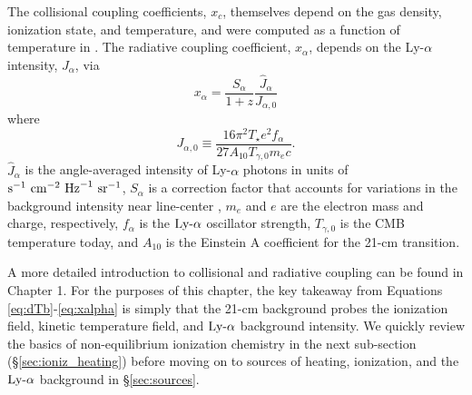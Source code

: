 The collisional coupling coefficients, $x_c$, themselves depend on the gas density, ionization state, and temperature, and were computed as a function of temperature in \cite{Zygelman2005}. The radiative coupling coefficient, $x_{\alpha}$, depends on the Ly-$\alpha$ intensity, $J_{\alpha}$, via
\begin{equation}
    x_{\alpha} = \frac{S_{\alpha}}{1+z} \frac{\hat{J}_{\alpha}}{{J}_{\alpha,0}} \label{eq:xalpha}
\end{equation}
where
\begin{equation}
    J_{\alpha,0} \equiv \frac{16\pi^2 T_{\star} e^2 f_{\alpha}}{27 A_{10} T_{\gamma,0} m_e c} . \label{eq:Jnorm}
\end{equation}
$\hat{J}_{\alpha}$ is the angle-averaged intensity of Ly-$\alpha$ photons in
units of $\text{s}^{-1} \ \text{cm}^{-2} \ \mathrm{Hz}^{-1} \ \text{sr}^{-1}$, $S_{\alpha}$ is a correction factor that
accounts for variations in the background intensity near line-center
\cite{Chen2004,FurlanettoPritchard2006,Hirata2006}, $m_e$ and $e$ are the
electron mass and charge, respectively, $f_{\alpha}$ is the $\text{Ly-}\alpha$ oscillator
strength, $T_{\gamma,0}$ is the CMB temperature today, and $A_{10}$ is the Einstein A coefficient for the 21-cm transition.

A more detailed introduction to collisional and radiative coupling can be found in Chapter 1. For the purposes of this chapter, the key takeaway from Equations \ref{eq:dTb}-\ref{eq:xalpha} is simply that the 21-cm background probes the ionization field, kinetic temperature field, and $\text{Ly-}\alpha$ background intensity. We quickly review the basics of non-equilibrium ionization chemistry in the next sub-section (\S\ref{sec:ioniz_heating}) before moving on to sources of heating, ionization, and the $\text{Ly-}\alpha$ background in \S\ref{sec:sources}.



